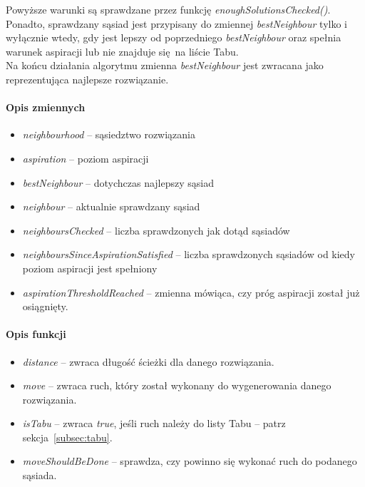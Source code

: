 \documentclass[11pt,a4paper]{article}
\begin{document}
Powyższe warunki są sprawdzane przez funkcję \textit{enoughSolutionsChecked()}.\\

Ponadto, sprawdzany sąsiad jest przypisany do zmiennej \textit{bestNeighbour} tylko i wyłącznie wtedy, gdy jest lepszy od poprzedniego \textit{bestNeighbour} oraz spełnia warunek aspiracji lub nie znajduje się na liście Tabu.\\

Na końcu działania algorytmu zmienna \textit{bestNeighbour} jest zwracana jako reprezentująca najlepsze rozwiązanie.

\paragraph{Opis zmiennych}
\begin{itemize}
  \item \textit{neighbourhood} -- sąsiedztwo rozwiązania
  \item \textit{aspiration} -- poziom aspiracji
  \item \textit{bestNeighbour} -- dotychczas najlepszy sąsiad
  \item \textit{neighbour} -- aktualnie sprawdzany sąsiad
  \item \textit{neighboursChecked} -- liczba sprawdzonych jak dotąd sąsiadów
  \item \textit{neighboursSinceAspirationSatisfied} -- liczba sprawdzonych sąsiadów od kiedy poziom aspiracji jest spełniony
  \item \textit{aspirationThresholdReached} -- zmienna mówiąca, czy próg aspiracji został już osiągnięty.
\end{itemize}

\paragraph{Opis funkcji}
\begin{itemize}
  \item \textit{distance} -- zwraca długość ścieżki dla danego rozwiązania.
  \item \textit{move} -- zwraca ruch, który został wykonany do wygenerowania danego rozwiązania.
  \item \textit{isTabu} -- zwraca \textit{true}, jeśli ruch należy do listy Tabu -- patrz sekcja~\ref{subsec:tabu}.
  \item \textit{moveShouldBeDone} -- sprawdza, czy powinno się wykonać ruch do podanego sąsiada.
\end{itemize}
\end{document}
